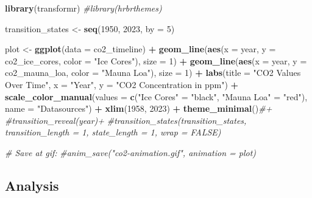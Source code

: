 \documentclass[
]{article}
\newenvironment{Shaded}{\begin{snugshade}}{\end{snugshade}}
\newcommand{\AttributeTok}[1]{\textcolor[rgb]{0.13,0.29,0.53}{#1}}
\newcommand{\CommentTok}[1]{\textcolor[rgb]{0.56,0.35,0.01}{\textit{#1}}}
\newcommand{\DecValTok}[1]{\textcolor[rgb]{0.00,0.00,0.81}{#1}}
\newcommand{\FunctionTok}[1]{\textcolor[rgb]{0.13,0.29,0.53}{\textbf{#1}}}
\newcommand{\NormalTok}[1]{#1}
\newcommand{\OtherTok}[1]{\textcolor[rgb]{0.56,0.35,0.01}{#1}}
\newcommand{\SpecialCharTok}[1]{\textcolor[rgb]{0.81,0.36,0.00}{\textbf{#1}}}
\newcommand{\StringTok}[1]{\textcolor[rgb]{0.31,0.60,0.02}{#1}}
\begin{document}
\begin{Shaded}
\begin{Highlighting}[]
\FunctionTok{library}\NormalTok{(transformr)}
\CommentTok{\#library(hrbrthemes)}

\NormalTok{transition\_states }\OtherTok{\textless{}{-}} \FunctionTok{seq}\NormalTok{(}\DecValTok{1950}\NormalTok{, }\DecValTok{2023}\NormalTok{, }\AttributeTok{by =} \DecValTok{5}\NormalTok{)}

\NormalTok{plot }\OtherTok{\textless{}{-}} \FunctionTok{ggplot}\NormalTok{(}\AttributeTok{data =}\NormalTok{ co2\_timeline) }\SpecialCharTok{+}
  \FunctionTok{geom\_line}\NormalTok{(}\FunctionTok{aes}\NormalTok{(}\AttributeTok{x =}\NormalTok{ year, }\AttributeTok{y =}\NormalTok{ co2\_ice\_cores, }\AttributeTok{color =} \StringTok{"Ice Cores"}\NormalTok{), }\AttributeTok{size =} \DecValTok{1}\NormalTok{) }\SpecialCharTok{+}
  \FunctionTok{geom\_line}\NormalTok{(}\FunctionTok{aes}\NormalTok{(}\AttributeTok{x =}\NormalTok{ year, }\AttributeTok{y =}\NormalTok{ co2\_mauna\_loa, }\AttributeTok{color =} \StringTok{"Mauna Loa"}\NormalTok{), }\AttributeTok{size =} \DecValTok{1}\NormalTok{) }\SpecialCharTok{+}
  \FunctionTok{labs}\NormalTok{(}\AttributeTok{title =} \StringTok{"CO2 Values Over Time"}\NormalTok{,}
       \AttributeTok{x =} \StringTok{"Year"}\NormalTok{,}
       \AttributeTok{y =} \StringTok{"CO2 Concentration in ppm"}\NormalTok{) }\SpecialCharTok{+}
  \FunctionTok{scale\_color\_manual}\NormalTok{(}\AttributeTok{values =} \FunctionTok{c}\NormalTok{(}\StringTok{"Ice Cores"} \OtherTok{=} \StringTok{"black"}\NormalTok{, }\StringTok{"Mauna Loa"} \OtherTok{=} \StringTok{"red"}\NormalTok{),}
                     \AttributeTok{name =} \StringTok{"Datasources"}\NormalTok{) }\SpecialCharTok{+}
  \FunctionTok{xlim}\NormalTok{(}\DecValTok{1958}\NormalTok{, }\DecValTok{2023}\NormalTok{) }\SpecialCharTok{+}
  \FunctionTok{theme\_minimal}\NormalTok{()}\CommentTok{\#+}
  \CommentTok{\#transition\_reveal(year)+}
  \CommentTok{\#transition\_states(transition\_states, transition\_length = 1, state\_length = 1, wrap = FALSE)}


\CommentTok{\# Save at gif:}
\CommentTok{\#anim\_save("co2{-}animation.gif", animation = plot)}
\end{Highlighting}
\end{Shaded}

\hypertarget{analysis}{%
\subsection{Analysis}\label{analysis}}
\end{document}
